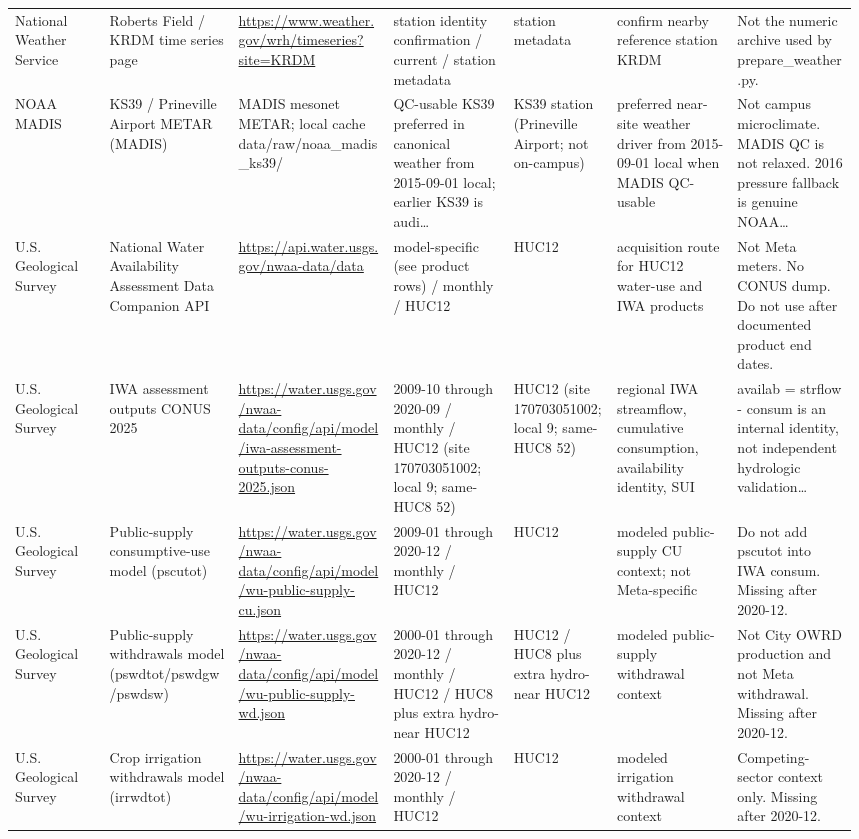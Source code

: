 \documentclass[11pt]{article}
\begin{document}
\begin{longtable}{@{}p{0.11\linewidth}p{0.15\linewidth}p{0.18\linewidth}p{0.14\linewidth}p{0.12\linewidth}p{0.14\linewidth}p{0.14\linewidth}@{}}
National Weather Service & Roberts Field / KRDM time series page & \url{https://www.weather.gov/wrh/timeseries?site=KRDM} & station identity confirmation / current / station metadata & station metadata & confirm nearby reference station KRDM & Not the numeric archive used by prepare\_weather.py.\\
NOAA MADIS & KS39 / Prineville Airport METAR (MADIS) & MADIS mesonet METAR; local cache data/raw/noaa\_madis\_ks39/ & QC-usable KS39 preferred in canonical weather from 2015-09-01 local; earlier KS39 is audi\ldots & KS39 station (Prineville Airport; not on-campus) & preferred near-site weather driver from 2015-09-01 local when MADIS QC-usable & Not campus microclimate. MADIS QC is not relaxed. 2016 pressure fallback is genuine NOAA\ldots\\
U.S. Geological Survey & National Water Availability Assessment Data Companion API & \url{https://api.water.usgs.gov/nwaa-data/data} & model-specific (see product rows) / monthly / HUC12 & HUC12 & acquisition route for HUC12 water-use and IWA products & Not Meta meters. No CONUS dump. Do not use after documented product end dates.\\
U.S. Geological Survey & IWA assessment outputs CONUS 2025 & \url{https://water.usgs.gov/nwaa-data/config/api/model/iwa-assessment-outputs-conus-2025.json} & 2009-10 through 2020-09 / monthly / HUC12 (site 170703051002; local 9; same-HUC8 52) & HUC12 (site 170703051002; local 9; same-HUC8 52) & regional IWA streamflow, cumulative consumption, availability identity, SUI & availab = strflow - consum is an internal identity, not independent hydrologic validation\ldots\\
U.S. Geological Survey & Public-supply consumptive-use model (pscutot) & \url{https://water.usgs.gov/nwaa-data/config/api/model/wu-public-supply-cu.json} & 2009-01 through 2020-12 / monthly / HUC12 & HUC12 & modeled public-supply CU context; not Meta-specific & Do not add pscutot into IWA consum. Missing after 2020-12.\\
U.S. Geological Survey & Public-supply withdrawals model (pswdtot/pswdgw/pswdsw) & \url{https://water.usgs.gov/nwaa-data/config/api/model/wu-public-supply-wd.json} & 2000-01 through 2020-12 / monthly / HUC12 / HUC8 plus extra hydro-near HUC12 & HUC12 / HUC8 plus extra hydro-near HUC12 & modeled public-supply withdrawal context & Not City OWRD production and not Meta withdrawal. Missing after 2020-12.\\
U.S. Geological Survey & Crop irrigation withdrawals model (irrwdtot) & \url{https://water.usgs.gov/nwaa-data/config/api/model/wu-irrigation-wd.json} & 2000-01 through 2020-12 / monthly / HUC12 & HUC12 & modeled irrigation withdrawal context & Competing-sector context only. Missing after 2020-12.\\

\end{longtable}
\end{document}
